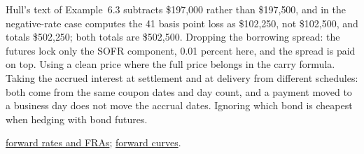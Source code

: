 \begin{qfmethod}
 Hull's text of Example~6.3 subtracts \$197{,}000 rather than \$197{,}500, and in the negative-rate case computes the 41 basis point loss as \$102{,}250, not \$102{,}500, and totals \$502{,}250; both totals are \$502{,}500. Dropping the borrowing spread: the futures lock only the SOFR component, 0.01 percent here, and the spread is paid on top. Using a clean price where the full price belongs in the carry formula. Taking the accrued interest at settlement and at delivery from different schedules: both come from the same coupon dates and day count, and a payment moved to a business day does not move the accrual dates. Ignoring which bond is cheapest when hedging with bond futures.

 \hyperref[mod:forward-rates-fra]{forward rates and FRAs}; \hyperref[meth:spot-par-forward-curves]{forward curves}.

\end{qfmethod}

